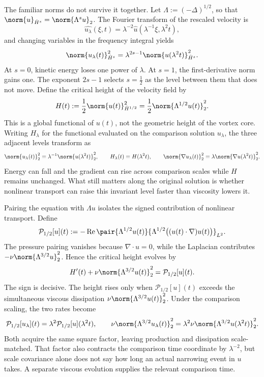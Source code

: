 
The familiar norms do not survive it together. Let \(\Lambda:=(-\Delta)^{1/2}\), so that \(\norm{u}_{\dot H^s}=\norm{\Lambda^s u}_2\). The Fourier transform of the rescaled velocity is
\[
  \widehat{u_\lambda}(\xi,t)
  =
  \lambda^{-2}\widehat u(\lambda^{-1}\xi,\lambda^2t),
\]
and changing variables in the frequency integral yields
\[
  \norm{u_\lambda(t)}_{\dot H^s}^2
  =
  \lambda^{2s-1}
  \norm{u(\lambda^2t)}_{\dot H^s}^2.
\]
At \(s=0\), kinetic energy loses one power of \(\lambda\). At \(s=1\), the first-derivative norm gains one. The exponent \(2s-1\) selects \(s=\tfrac12\) as the level between them that does not move. Define the critical height of the velocity field by
\[
  H(t)
  :=
  \frac12\norm{u(t)}_{\dot H^{1/2}}^2
  =
  \frac12\norm{\Lambda^{1/2}u(t)}_2^2.
\]
This is a global functional of \(u(t)\), not the geometric height of the vortex core. Writing \(H_\lambda\) for the functional evaluated on the comparison solution \(u_\lambda\), the three adjacent levels transform as
\[
  \norm{u_\lambda(t)}_2^2
  =
  \lambda^{-1}\norm{u(\lambda^2t)}_2^2,
  \qquad
  H_\lambda(t)=H(\lambda^2t),
  \qquad
  \norm{\nabla u_\lambda(t)}_2^2
  =
  \lambda\norm{\nabla u(\lambda^2t)}_2^2.
\]
Energy can fall and the gradient can rise across comparison scales while \(H\) remains unchanged. What still matters along the original solution is whether nonlinear transport can raise this invariant level faster than viscosity lowers it.


Pairing the equation with \(\Lambda u\) isolates the signed contribution of nonlinear transport. Define
\[
  \mathcal P_{1/2}[u](t)
  :=
  -\operatorname{Re}
  \pair
    {\Lambda^{1/2}u(t)}
    {\Lambda^{1/2}\bigl((u(t)\cdot\nabla)u(t)\bigr)}_{L^2}.
\]
The pressure pairing vanishes because \(\nabla\cdot u=0\), while the Laplacian contributes \(-\nu\norm{\Lambda^{3/2}u}_2^2\). Hence the critical height evolves by
\[
  H'(t)
  +
  \nu\norm{\Lambda^{3/2}u(t)}_2^2
  =
  \mathcal P_{1/2}[u](t).
\]
The sign is decisive. The height rises only when \(\mathcal P_{1/2}[u](t)\) exceeds the simultaneous viscous dissipation \(\nu\norm{\Lambda^{3/2}u(t)}_2^2\). Under the comparison scaling, the two rates become
\[
  \mathcal P_{1/2}[u_\lambda](t)
  =
  \lambda^2\mathcal P_{1/2}[u](\lambda^2t),
  \qquad
  \nu\norm{\Lambda^{3/2}u_\lambda(t)}_2^2
  =
  \lambda^2\nu\norm{\Lambda^{3/2}u(\lambda^2t)}_2^2.
\]
Both acquire the same square factor, leaving production and dissipation scale-matched. That factor also contracts the comparison time coordinate by \(\lambda^{-2}\), but scale covariance alone does not say how long an actual narrowing event in \(u\) takes. A separate viscous evolution supplies the relevant comparison time.

